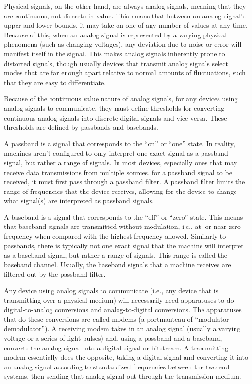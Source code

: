 \documentclass[11pt]{article}
\begin{document}
Physical signals, on the other hand, are always analog signals, meaning that they are continuous, not discrete in value. This means that between an analog signal’s upper and lower bounds, it may take on one of any number of values at any time. Because of this, when an analog signal is represented by a varying physical phenomena (such as changing voltages), any deviation due to noise or error will manifest itself in the signal. This makes analog signals inherently prone to distorted signals, though usually devices that transmit analog signals select modes that are far enough apart relative to normal amounts of fluctuations, such that they are easy to differentiate. 

Because of the continuous value nature of analog signals, for any devices using analog signals to communicate, they must define thresholds for converting continuous analog signals into discrete digital signals and vice versa. These thresholds are defined by passbands and basebands.

A passband is a signal that corresponds to the “on” or “one” state. In reality, machines aren’t configured to only interpret one exact signal as a passband signal, but rather a range of signals. In most devices, especially ones that may receive data transmissions from multiple sources, for a passband signal to be received, it must first pass through a passband filter. A passband filter limits the range of frequencies that the device receives, allowing for the device to change what signal(s) are interpreted as passband signals.

A baseband is a signal that corresponds to the “off” or “zero” state. This means that baseband signals are transmitted without modulation, i.e., at, or near zero-frequency when compared with the highest frequency allowed. Similarly to passbands, there is typically not one exact signal that the machine will interpret as a baseband signal, but rather a range of signals. This range is called the baseband channel. Usually, the baseband signals that a machine receives are filtered out by the passband filter.

Any device using analog signals to communicate (i.e., any device that is transmitting over a physical medium) will necessarily need apparatuses to do digital-to-analog conversions and analog-to-digital conversions. The apparatuses that do these conversions are called modems (a portmanteau of “modulator-demodulator”). A receiving modem takes in an analog signal (usually a varying voltage or a series of light pulses) and, using a passband and a baseband, converts the analog signal into a digital signal or bitstream. A transmitting modem essentially does the opposite, taking a digital signal and converting it into an analog signal according to standardized frequencies between the two end systems, then sending that analog signal out through the transmission medium.
\end{document}
